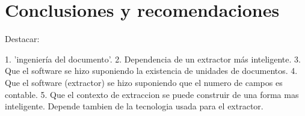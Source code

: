 \chapter*{Conclusiones y recomendaciones} \label{chap:conclusiones}

Destacar:

1.  'ingeniería del documento'. 
2. Dependencia de un extractor más inteligente.
3. Que el software se hizo suponiendo la existencia de unidades de documentos. 
4. Que el software (extractor) se hizo suponiendo que el numero de campos es contable.
5. Que el contexto de extraccion se puede construir de una forma mas inteligente. Depende tambien de la tecnologia usada para el extractor. 